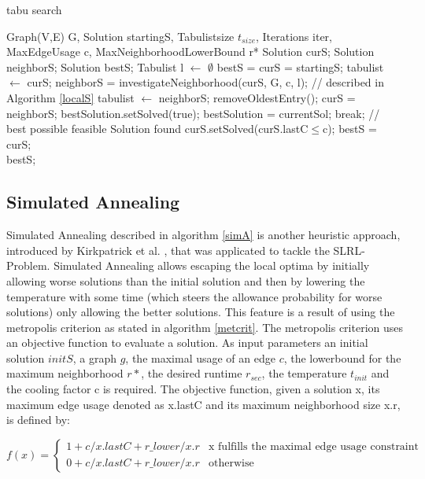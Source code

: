 \documentclass [12pt]{article}
\begin{document}
\begin {algorithm} [H]
\caption {tabu search}
\label {tabusa}
\begin {algorithmic} [3]
\Require Graph(V,E) G, Solution startingS, Tabulistsize $t_{size}$, Iterations iter, MaxEdgeUsage c, MaxNeighborhoodLowerBound r*
\State Solution curS;
\State Solution neighborS;
\State Solution bestS;
\State Tabulist l $\gets$ $\emptyset$
\State bestS = curS = startingS;
\State tabulist $\gets$ curS;
\State  neighborS = investigateNeighborhood(curS, G, c, l); // described in Algorithm \ref{localS}
\State  tabulist $\gets$ neighborS;
\State removeOldestEntry();
\EndIf
\State  curS = neighborS;
\State bestSolution.setSolved(true);
\State bestSolution = currentSol;
\State break; // best possible feasible Solution found
\EndIf
\EndIf  
{}
\State curS.setSolved(curS.lastC$\leq$c);
\State bestS = curS;
\EndIf 
\EndFor\\
\Return bestS;
\end {algorithmic}
\end {algorithm}


\subsection{Simulated Annealing}
Simulated Annealing described in algorithm \ref{simA} is another heuristic approach, introduced by Kirkpatrick et al. \cite{Kirkpatrick83optimizationby}, that
was applicated to tackle the SLRL-Problem. Simulated Annealing allows 
escaping the local optima by initially allowing worse solutions than the initial solution and then by lowering the temperature 
with some time (which steers the allowance probability for worse solutions)
only allowing the better solutions.
This feature is a result of using the metropolis criterion as stated in algorithm \ref{metcrit}. The metropolis criterion uses an objective function to evaluate a solution.
As input parameters an initial solution $initS$, a graph $g$, the maximal usage of an edge $c$, the lowerbound for the maximum neighborhood $r*$,
the desired runtime $r_{sec}$, the temperature $t_{init}$ and the cooling factor c is required.
The objective function, given a solution x, its maximum edge usage denoted as x.lastC and its maximum neighborhood size x.r, is defined by:

\begin{equation*}
      f(x) = \begin{cases}
                       1 + c/x.lastC  + r\_lower/x.r             & \text {x fulfills the maximal edge usage constraint}\\
                       0 + c/x.lastC + r\_lower/x.r            & \text{otherwise}
                   \end{cases}
\end{equation*}
\medskip
\end{document}
